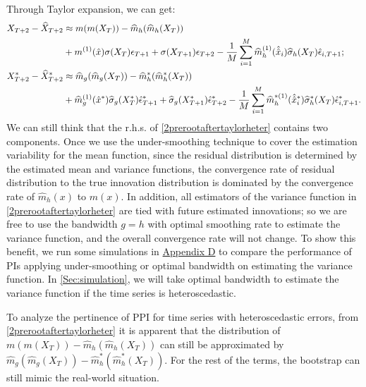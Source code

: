 \documentclass[a4paper]{article}
\begin{document}
Through Taylor expansion, we can get:
\begin{equation}\label{2prerootaftertaylorheter}
\begin{split}
    X_{T+2} - \widehat{X}_{T+2}  &\approx  m(m(X_T)) - \widehat{m}_{h}(\widehat{m}_{h}(X_T)) \\
    &+ m^{(1)}(\hat{x})\sigma(X_{T})\epsilon_{T+1} + \sigma(X_{T+1})\epsilon_{T+2}  - \frac{1}{M}\sum_{i=1}^{M}\widehat{m}^{(1)}_{h}(\Hat{\Hat{x}}_i)\widehat{\sigma}_h(X_T)\hat{\epsilon}_{i,T+1};\\
    X^*_{T+2} - \widehat{X}^*_{T+2} &\approx  \widehat{m}_{g}(\widehat{m}_{g}(X_T)) - \widehat{m}^*_{h}(\widehat{m}^*_{h}(X_T)) \\
    &+ \widehat{m}_{g}^{(1)}(\hat{x}^*)\widehat{\sigma}_{g}(X_{T}^*)\hat{\epsilon}^*_{T+1} + \widehat{\sigma}_{g}(X_{T+1}^*)\hat{\epsilon}^*_{T+2}  - \frac{1}{M}\sum_{i=1}^{M}\widehat{m}^{*(1)}_{h}(\Hat{\Hat{x}}_i^*)\widehat{\sigma}_{h}^{*}(X_T)\hat{\epsilon}^*_{i,T+1}.
\end{split}
\end{equation}
We can still think that the r.h.s. of \cref{2prerootaftertaylorheter} contains two components. Once we use the under-smoothing technique to cover the estimation variability for the mean function, since the residual distribution is determined by the estimated mean and variance functions, the convergence rate of residual distribution to the true innovation distribution is dominated by the convergence rate of $\widehat{m}_h(x)$ to $m(x)$. In addition, all estimators of the variance function in \cref{2prerootaftertaylorheter} are tied with future estimated innovations; so we are free to use the bandwidth $g=h$ with optimal
smoothing rate to estimate the variance function, and the overall convergence rate will not change. To show this benefit, we run some simulations in \hyperref[Appendix:optbandwidthonestvar]{Appendix D} to compare the performance of PIs   applying under-smoothing or optimal bandwidth on estimating the variance function. In \cref{Sec:simulation}, we will take optimal bandwidth to estimate the variance function if the time series is heteroscedastic.  

To analyze the pertinence of PPI for time series with heteroscedastic errors, from \cref{2prerootaftertaylorheter} it is apparent that the distribution of $m(m(X_T)) - \widehat{m}_{h}(\widehat{m}_{h}(X_T))$ can still be approximated by $\widehat{m}_{g}(\widehat{m}_{g}(X_T)) - \widehat{m}^*_{h}(\widehat{m}^*_{h}(X_T))$. For the rest of the terms, the bootstrap can still mimic the real-world situation.
\end{document}
